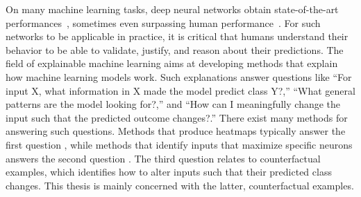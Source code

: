 \documentclass[11pt,a4paper,twoside,openright,final]{memoir}
\begin{document}
On many machine learning tasks, deep neural networks obtain state-of-the-art performances~\cite{todo}, sometimes even surpassing human performance~\cite{todo}.
For such networks to be applicable in practice, it is critical that humans understand their behavior to be able to validate, justify, and reason about their predictions. 
The field of explainable machine learning aims at developing methods that explain how machine learning models work.
Such explanations answer questions like ``For input X, what information in X made the model predict class Y?,''  ``What general patterns are the model looking for?,'' and ``How can I meaningfully change the input such that the predicted outcome changes?.'' 
There exist many methods for answering such questions. 
Methods that produce heatmaps typically answer the first question \cite{lrp}, while methods that identify inputs that maximize specific neurons answers the second question \cite{carter2019activation}. 
The third question relates to counterfactual examples, which identifies how to alter inputs such that their predicted class changes.
This thesis is mainly concerned with the latter, counterfactual examples. 
\end{document}
